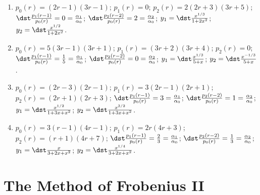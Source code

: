 \documentclass[openany]{book}
\newenvironment{sectionSolutions}{
 \begin{enumerate}[item-label={\thesection.\arabic{enumi}.}]
}{
 \end{enumerate}
}
\begin{document}
\begin{sectionSolutions}
\item
$p_0(r)=(2r-1)(3r-1)$;
$p_1(r)=0$;
$p_2(r)=2(2r+3)(3r+5)$;
$\dst\frac{p_1(r-1)}{ p_0(r)}=0=\frac{\alpha_1}{\alpha_0}$;
$\dst\frac{p_2(r-2)}{ p_0(r)}=2=\frac{\alpha_2}{\alpha_0}$;
$y_1=\dst\frac{x^{1/3}}{1+2x^2}$; $y_2=\dst\frac{x^{1/2}}{1+2x^2}$.


\item
$p_0(r)=5(3r-1)(3r+1)$;
$p_1(r)=(3r+2)(3r+4)$;
$p_2(r)=0$;
$\dst\frac{p_1(r-1)}{ p_0(r)}=\frac{1}{5}=\frac{\alpha_1}{\alpha_0}$;
$\dst\frac{p_2(r-2)}{ p_0(r)}=0=\frac{\alpha_2}{\alpha_0}$;
$y_1=\dst\frac{x^{1/3}}{5+x}$; $y_2=\dst\frac{x^{-1/3}}{5+x}$.


\item
$p_0(r)=(2r-3)(2r-1)$;
$p_1(r)=3(2r-1)(2r+1)$;
$p_2(r)=(2r+1)(2r+3)$;
$\dst\frac{p_1(r-1)}{ p_0(r)}=3=\frac{\alpha_1}{\alpha_0}$;
$\dst\frac{p_2(r-2)}{ p_0(r)}=1=\frac{\alpha_2}{\alpha_0}$;
$y_1=\dst\frac{x^{1/2}}{1+3x+x^2}$;  $y_2=\dst\frac{x^{3/2}}{1+3x+x^2}$.

\item
$p_0(r)=3(r-1)(4r-1)$;
$p_1(r)=2r(4r+3)$;
$p_2(r)=(r+1)(4r+7)$;
$\dst\frac{p_1(r-1)}{ p_0(r)}=\frac{2}{3}=\frac{\alpha_1}{\alpha_0}$;
$\dst\frac{p_2(r-2)}{ p_0(r)}=\frac{1}{3}=\frac{\alpha_2}{\alpha_0}$;
$y_1=\dst\frac{x}{3+2x+x^2}$; $y_2=\dst\frac{x^{1/4}}{3+2x+x^2}$.
\end{sectionSolutions}

\section{The Method of Frobenius II}
\end{document}
